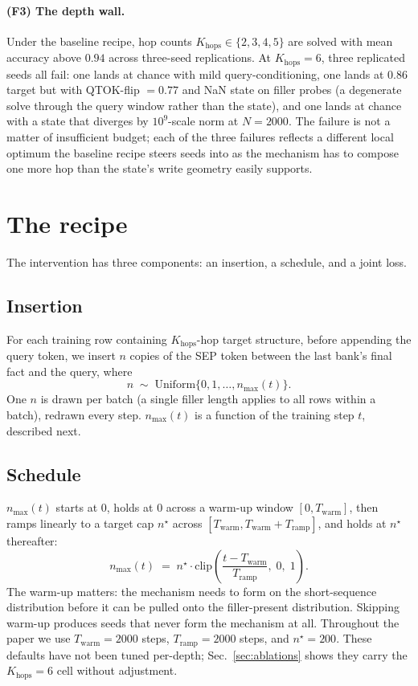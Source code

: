 \documentclass[11pt]{article}
\begin{document}
\paragraph{(F3) The depth wall.} Under the baseline recipe, hop
counts $K_{\mathrm{hops}} \in \{2, 3, 4, 5\}$ are solved with mean
accuracy above $0.94$ across three-seed replications. At
$K_{\mathrm{hops}} = 6$, three replicated seeds all fail: one lands
at chance with mild query-conditioning, one lands at $0.86$ target
but with QTOK-flip $= 0.77$ and NaN state on filler probes (a
degenerate solve through the query window rather than the state),
and one lands at chance with a state that diverges by $10^9$-scale
norm at $N = 2000$. The failure is not a matter of insufficient
budget; each of the three failures reflects a different local
optimum the baseline recipe steers seeds into as the mechanism has
to compose one more hop than the state's write geometry easily
supports.

\section{The recipe}
\label{sec:method}

The intervention has three components: an insertion, a schedule, and
a joint loss.

\subsection{Insertion}

For each training row containing $K_{\mathrm{hops}}$-hop target
structure, before appending the query token, we insert $n$ copies of
the SEP token between the last bank's final fact and the query,
where
\[
  n \;\sim\; \mathrm{Uniform}\{0, 1, \dots, n_{\max}(t)\}.
\]
One $n$ is drawn per batch (a single filler length applies to all
rows within a batch), redrawn every step. $n_{\max}(t)$ is a
function of the training step $t$, described next.

\subsection{Schedule}

$n_{\max}(t)$ starts at $0$, holds at $0$ across a warm-up window
$[0, T_{\mathrm{warm}}]$, then ramps linearly to a target cap
$n^\star$ across $[T_{\mathrm{warm}}, T_{\mathrm{warm}} + T_{\mathrm{ramp}}]$,
and holds at $n^\star$ thereafter:
\[
  n_{\max}(t) \;=\; n^\star \cdot \mathrm{clip}\!\left(
    \frac{t - T_{\mathrm{warm}}}{T_{\mathrm{ramp}}},\; 0,\; 1
  \right).
\]
The warm-up matters: the mechanism needs to form on the
short-sequence distribution before it can be pulled onto the
filler-present distribution. Skipping warm-up produces seeds that
never form the mechanism at all. Throughout the paper we use
$T_{\mathrm{warm}} = 2000$ steps, $T_{\mathrm{ramp}} = 2000$ steps,
and $n^\star = 200$. These defaults have not been tuned per-depth;
Sec.~\ref{sec:ablations} shows they carry the $K_{\mathrm{hops}}=6$
cell without adjustment.
\end{document}

